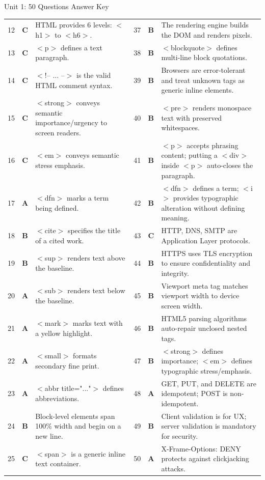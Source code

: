 \begin{answerkeytable}{Unit 1: 50 Questions Answer Key}
\begin{tabularx}{\textwidth}{l c X l c X}
12 & \textbf{C} & HTML provides 6 levels: $<$h1$>$ to $<$h6$>$. & 37 & \textbf{B} & The rendering engine builds the DOM and renders pixels. \\
13 & \textbf{C} & $<$p$>$ defines a text paragraph. & 38 & \textbf{B} & $<$blockquote$>$ defines multi-line block quotations. \\
14 & \textbf{C} & $<$!-- ... --$>$ is the valid HTML comment syntax. & 39 & \textbf{B} & Browsers are error-tolerant and treat unknown tags as generic inline elements. \\
15 & \textbf{C} & $<$strong$>$ conveys semantic importance/urgency to screen readers. & 40 & \textbf{B} & $<$pre$>$ renders monospace text with preserved whitespaces. \\
16 & \textbf{C} & $<$em$>$ conveys semantic stress emphasis. & 41 & \textbf{B} & $<$p$>$ accepts phrasing content; putting a $<$div$>$ inside $<$p$>$ auto-closes the paragraph. \\
17 & \textbf{A} & $<$dfn$>$ marks a term being defined. & 42 & \textbf{B} & $<$dfn$>$ defines a term; $<$i$>$ provides typographic alteration without defining meaning. \\
18 & \textbf{B} & $<$cite$>$ specifies the title of a cited work. & 43 & \textbf{C} & HTTP, DNS, SMTP are Application Layer protocols. \\
19 & \textbf{B} & $<$sup$>$ renders text above the baseline. & 44 & \textbf{B} & HTTPS uses TLS encryption to ensure confidentiality and integrity. \\
20 & \textbf{A} & $<$sub$>$ renders text below the baseline. & 45 & \textbf{B} & Viewport meta tag matches viewport width to device screen width. \\
21 & \textbf{A} & $<$mark$>$ marks text with a yellow highlight. & 46 & \textbf{B} & HTML5 parsing algorithms auto-repair unclosed nested tags. \\
22 & \textbf{A} & $<$small$>$ formats secondary fine print. & 47 & \textbf{B} & $<$strong$>$ defines importance; $<$em$>$ defines typographic stress/emphasis. \\
23 & \textbf{A} & $<$abbr title="..."$>$ defines abbreviations. & 48 & \textbf{A} & GET, PUT, and DELETE are idempotent; POST is non-idempotent. \\
24 & \textbf{B} & Block-level elements span 100\% width and begin on a new line. & 49 & \textbf{B} & Client validation is for UX; server validation is mandatory for security. \\
25 & \textbf{C} & $<$span$>$ is a generic inline text container. & 50 & \textbf{A} & X-Frame-Options: DENY protects against clickjacking attacks. \\
\bottomrule
\end{tabularx}
\end{answerkeytable}

